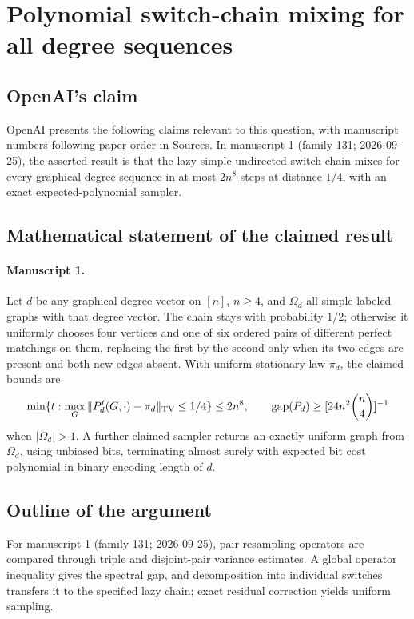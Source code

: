 \documentclass[11pt]{article}
\begin{document}
\section*{Polynomial switch-chain mixing for all degree sequences}

\subsection{OpenAI's claim}
OpenAI presents the following claims relevant to this question, with manuscript numbers following paper order in Sources. In manuscript 1 (family 131; 2026-09-25), the asserted result is that the lazy simple-undirected switch chain mixes for every graphical degree sequence in at most $2n^8$ steps at distance $1/4$, with an exact expected-polynomial sampler.

\subsection{Mathematical statement of the claimed result}
\paragraph{Manuscript 1.}
Let $d$ be any graphical degree vector on $[n]$, $n\ge4$, and $\Omega_d$ all simple labeled graphs with that degree vector. The chain stays with probability $1/2$; otherwise it uniformly chooses four vertices and one of six ordered pairs of different perfect matchings on them, replacing the first by the second only when its two edges are present and both new edges absent. With uniform stationary law $\pi_d$, the claimed bounds are
\[
 \min\{t:\max_G\|P_d^t(G,\cdot)-\pi_d\|_{\rm TV}\le1/4\}\le2n^8,
 \qquad\operatorname{gap}(P_d)\ge[24n^2\binom n4]^{-1}
\]
when $|\Omega_d|>1$. A further claimed sampler returns an exactly uniform graph from $\Omega_d$, using unbiased bits, terminating almost surely with expected bit cost polynomial in binary encoding length of $d$.

\subsection{Outline of the argument}
For manuscript 1 (family 131; 2026-09-25), pair resampling operators are compared through triple and disjoint-pair variance estimates. A global operator inequality gives the spectral gap, and decomposition into individual switches transfers it to the specified lazy chain; exact residual correction yields uniform sampling.
\end{document}
